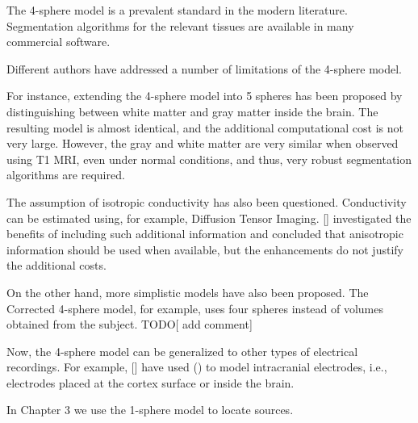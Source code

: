 The 4-sphere model is a prevalent standard in the modern literature.
%
Segmentation algorithms for the relevant tissues are available in many commercial software.

Different authors have addressed a number of limitations of the 4-sphere model.

For instance, extending the 4-sphere model into 5 spheres has been proposed by distinguishing between white matter and gray matter inside the brain.
%
The resulting model is almost identical, and the additional computational cost is not very large. 
%
However, the gray and white matter are very similar when observed using T1 MRI, even under normal conditions, and thus, very robust segmentation algorithms are required.

The assumption of isotropic conductivity has also been questioned.
%
Conductivity can be estimated using, for example, Diffusion Tensor Imaging.
%
[] investigated the benefits of including such additional information and concluded that anisotropic information should be used when available, but the enhancements do not justify the additional costs.

On the other hand, more simplistic models have also been proposed.
%
The Corrected 4-sphere model, for example, uses four spheres instead of volumes obtained from the subject.
%
TODO[ add comment]

Now, the 4-sphere model can be generalized to other types of electrical recordings.
%
For example, [] have used () to model intracranial electrodes, i.e., electrodes placed at the cortex surface or inside the brain.

In Chapter 3 we use the 1-sphere model to locate sources. 
